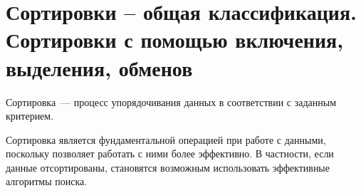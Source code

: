 %
%

\section{Сортировки – общая классификация. Сортировки с помощью включения, выделения, обменов}
Сортировка~--- процесс упорядочивания данных в соответствии с заданным критерием.

Сортировка является фундаментальной операцией при работе с данными, поскольку позволяет работать с ними более
эффективно. В частности, если данные отсортированы, становятся возможным использовать эффективные алгоритмы поиска.
